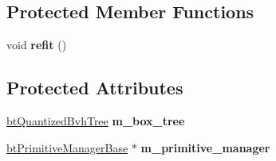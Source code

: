\subsection*{Protected Member Functions}
\begin{DoxyCompactItemize}
\item 
\hypertarget{classbt_g_impact_quantized_bvh_a7aa23f402fe08b65576b3a5a24a6efb6}{void {\bfseries refit} ()}\label{classbt_g_impact_quantized_bvh_a7aa23f402fe08b65576b3a5a24a6efb6}

\end{DoxyCompactItemize}
\subsection*{Protected Attributes}
\begin{DoxyCompactItemize}
\item 
\hypertarget{classbt_g_impact_quantized_bvh_a617f9be0d5faddadabd3b304ab596d96}{\hyperlink{classbt_quantized_bvh_tree}{bt\+Quantized\+Bvh\+Tree} {\bfseries m\+\_\+box\+\_\+tree}}\label{classbt_g_impact_quantized_bvh_a617f9be0d5faddadabd3b304ab596d96}

\item 
\hypertarget{classbt_g_impact_quantized_bvh_a1669691bf1cbf77d517dca41c03f0d59}{\hyperlink{classbt_primitive_manager_base}{bt\+Primitive\+Manager\+Base} $\ast$ {\bfseries m\+\_\+primitive\+\_\+manager}}\label{classbt_g_impact_quantized_bvh_a1669691bf1cbf77d517dca41c03f0d59}

\end{DoxyCompactItemize}
